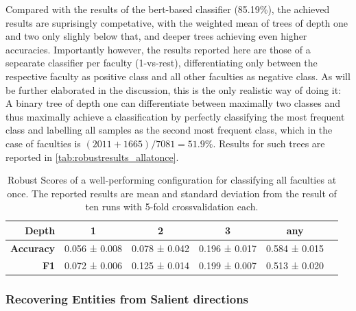 Compared with the results of the \gls{bert}-based classifier (85.19\%), the achieved results are suprisingly competative, with the weighted mean of trees of depth one and two only slighly below that, and deeper trees achieving even higher accuracies. 
Importantly however, the results reported here are those of a sepearate classifier per faculty (1-vs-rest), differentiating only between the respective faculty as positive class and all other faculties as negative class. As will be further elaborated in the discussion, this is the only realistic way of doing it: A binary tree of depth one can differentiate between maximally two classes and thus maximally achieve a classification by perfectly classifying the most frequent class and labelling all samples as the second most frequent class, which in the case of faculties is $(2011+1665)/7081=51.9\%$. Results for such trees are reported in \autoref{tab:robustresults_allatonce}.

\begin{table}[H]
	\begin{tabular}{rccccc}
		\toprule
		\textbf{Depth} &  \textbf{1} & \textbf{2} & \textbf{3} & \textbf{any} \\
		\midrule
		\textbf{Accuracy} & 0.056 ± 0.008 & 0.078 ± 0.042 & 0.196 ± 0.017 & 0.584 ± 0.015 \\
		\textbf{F1}       & 0.072 ± 0.006 & 0.125 ± 0.014 & 0.199 ± 0.007 & 0.513 ± 0.020 \\
		\bottomrule
	\end{tabular}
	\caption[Robust Scores for classifying all faculties at once]{Robust Scores of a well-performing configuration for classifying all faculties at once. The reported results are mean and standard deviation from the result of ten runs with 5-fold crossvalidation each.}
	\label{tab:robustresults_allatonce}
\end{table}


\subsubsection{Recovering Entities from Salient directions}

